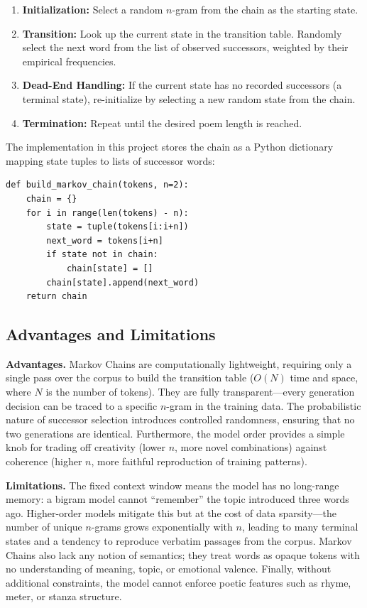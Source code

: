 \documentclass[conference]{IEEEtran}
\begin{document}
\begin{enumerate}
    \item \textbf{Initialization:} Select a random $n$-gram from the chain as the starting state.
    \item \textbf{Transition:} Look up the current state in the transition table. Randomly select the next word from the list of observed successors, weighted by their empirical frequencies.
    \item \textbf{Dead-End Handling:} If the current state has no recorded successors (a terminal state), re-initialize by selecting a new random state from the chain.
    \item \textbf{Termination:} Repeat until the desired poem length is reached.
\end{enumerate}

The implementation in this project stores the chain as a Python dictionary mapping state tuples to lists of successor words:

\begin{lstlisting}[style=pythonstyle, caption={Core Markov Chain construction}]
def build_markov_chain(tokens, n=2):
    chain = {}
    for i in range(len(tokens) - n):
        state = tuple(tokens[i:i+n])
        next_word = tokens[i+n]
        if state not in chain:
            chain[state] = []
        chain[state].append(next_word)
    return chain
\end{lstlisting}

\subsection{Advantages and Limitations}

\textbf{Advantages.}
Markov Chains are computationally lightweight, requiring only a single pass over the corpus to build the transition table ($O(N)$ time and space, where $N$ is the number of tokens). They are fully transparent---every generation decision can be traced to a specific $n$-gram in the training data. The probabilistic nature of successor selection introduces controlled randomness, ensuring that no two generations are identical. Furthermore, the model order provides a simple knob for trading off creativity (lower $n$, more novel combinations) against coherence (higher $n$, more faithful reproduction of training patterns).

\textbf{Limitations.}
The fixed context window means the model has no long-range memory: a bigram model cannot ``remember'' the topic introduced three words ago. Higher-order models mitigate this but at the cost of data sparsity---the number of unique $n$-grams grows exponentially with $n$, leading to many terminal states and a tendency to reproduce verbatim passages from the corpus. Markov Chains also lack any notion of semantics; they treat words as opaque tokens with no understanding of meaning, topic, or emotional valence. Finally, without additional constraints, the model cannot enforce poetic features such as rhyme, meter, or stanza structure.
\end{document}
